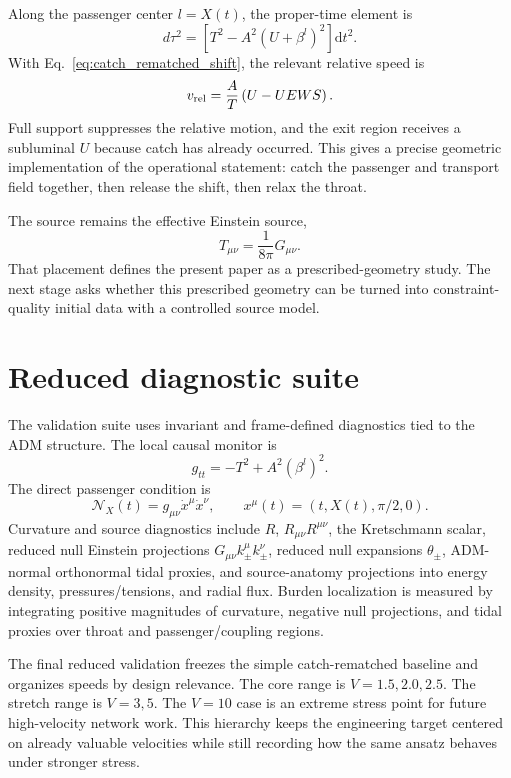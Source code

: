 \documentclass[11pt]{article}
\newcommand{\dd}{\mathrm{d}}
\begin{document}
Along the passenger center $l=X(t)$, the proper-time element is
\begin{equation}
 d\tau^2=\left[T^2-A^2\left(U+\beta^l\right)^2\right]\dd t^2.
\end{equation}
With Eq.~\eqref{eq:catch_rematched_shift}, the relevant relative speed is
\begin{equation}
 v_{\rm rel}=\frac{A}{T}\left(U-UEWS\right).
\end{equation}
Full support suppresses the relative motion, and the exit region receives a subluminal $U$ because catch has already occurred.  This gives a precise geometric implementation of the operational statement: catch the passenger and transport field together, then release the shift, then relax the throat.

The source remains the effective Einstein source,
\begin{equation}
 T_{\mu\nu}=\frac{1}{8\pi}G_{\mu\nu}.
\end{equation}
That placement defines the present paper as a prescribed-geometry study.  The next stage asks whether this prescribed geometry can be turned into constraint-quality initial data with a controlled source model.

\section{Reduced diagnostic suite}
The validation suite uses invariant and frame-defined diagnostics tied to the ADM structure.  The local causal monitor is
\begin{equation}
 g_{tt}=-T^2+A^2(\beta^l)^2.
\end{equation}
The direct passenger condition is
\begin{equation}
 \mathcal N_X(t)=g_{\mu\nu}\dot x^\mu\dot x^\nu,
 \qquad
 x^\mu(t)=(t,X(t),\pi/2,0).
\end{equation}
Curvature and source diagnostics include $R$, $R_{\mu\nu}R^{\mu\nu}$, the Kretschmann scalar, reduced null Einstein projections $G_{\mu\nu}k_\pm^\mu k_\pm^\nu$, reduced null expansions $\theta_\pm$, ADM-normal orthonormal tidal proxies, and source-anatomy projections into energy density, pressures/tensions, and radial flux.  Burden localization is measured by integrating positive magnitudes of curvature, negative null projections, and tidal proxies over throat and passenger/coupling regions.

The final reduced validation freezes the simple catch-rematched baseline and organizes speeds by design relevance.  The core range is $V=1.5,2.0,2.5$.  The stretch range is $V=3,5$.  The $V=10$ case is an extreme stress point for future high-velocity network work.  This hierarchy keeps the engineering target centered on already valuable velocities while still recording how the same ansatz behaves under stronger stress.
\end{document}
